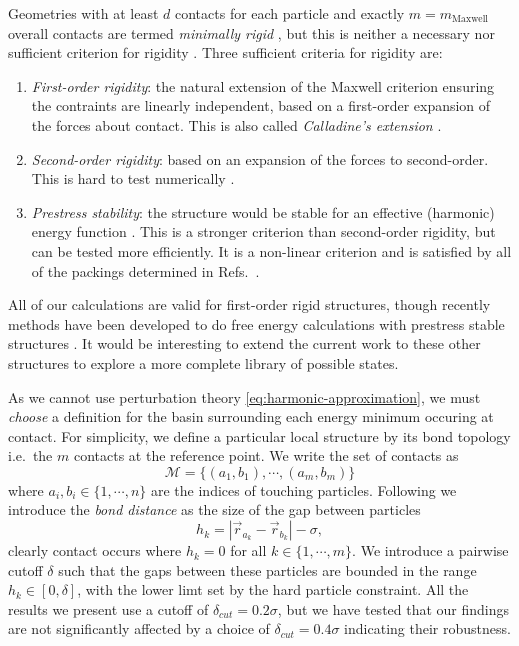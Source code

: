 \documentclass[11pt,twoside]{report}
\begin{document}
Geometries with at least $d$ contacts for each particle and exactly $m = m_\mathrm{Maxwell}$ overall contacts are termed \emph{minimally rigid} \cite{ArkusPRL2009}, but this is neither a necessary nor sufficient criterion for rigidity \cite{Holmes-CerfonARCMP2017}.
Three sufficient criteria for rigidity are: \cite{ConnellySJDM1996,Holmes-CerfonARCMP2017}
\begin{enumerate}
\item \emph{First-order rigidity}: the natural extension of the Maxwell criterion ensuring the contraints are linearly independent, based on a first-order expansion of the forces about contact.
  This is also called \emph{Calladine's extension} \cite{CalladineIJSS1978}.
\item \emph{Second-order rigidity}: based on an expansion of the forces to second-order.
  This is hard to test numerically \cite{Holmes-CerfonARCMP2017}.
\item \emph{Prestress stability}: the structure would be stable for an effective (harmonic) energy function \cite{ConnellySJDM1996}.
  This is a stronger criterion than second-order rigidity, but can be tested more efficiently.
  It is a non-linear criterion and is satisfied by all of the packings determined in Refs.\ \cite{ArkusPRL2009,Holmes-CerfonSR2016}.
\end{enumerate}
All of our calculations are valid for first-order rigid structures, though recently methods have been developed to do free energy calculations with prestress stable structures \cite{KallusPRE2017}.
It would be interesting to extend the current work to these other structures to explore a more complete library of possible states.

As we cannot use perturbation theory \eqref{eq:harmonic-approximation}, we must \emph{choose} a definition for the basin surrounding each energy minimum occuring at contact.
For simplicity, we define a particular local structure by its bond topology i.e.\ the $m$ contacts at the reference point.
We write the set of contacts as
\begin{equation}\label{eq:structure-contacts}
  \mathcal{M} = \{(a_1, b_1), \cdots, (a_m, b_m)\}
\end{equation}
where $a_i, b_i \in \{1, \cdots, n\}$ are the indices of touching particles.
Following \cite{Holmes-CerfonPNAS2013} we introduce the \emph{bond distance} as the size of the gap between particles
\begin{equation}\label{eq:bond-distance}
  h_k = |\vec{r}_{a_k} - \vec{r}_{b_k}| - \sigma,
\end{equation}
clearly contact occurs where $h_k = 0$ for all $k \in \{1, \cdots, m\}$.
We introduce a pairwise cutoff $\delta$ such that the gaps between these particles are bounded in the range $h_k \in [0, \delta]$, with the lower limt set by the hard particle constraint.
All the results we present use a cutoff of $\delta_{cut}=0.2 \sigma$, but we have tested that our findings are not significantly affected by a choice of $\delta_{cut}=0.4 \sigma$ indicating their robustness.
\end{document}
